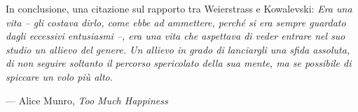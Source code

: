 \documentclass[serif,notheorems]{beamer}
\theoremstyle{definition} %
\theoremstyle{remark}
\begin{document}
\begin{frame}

\begin{center}
In conclusione, una citazione sul rapporto tra Weierstrass e Kowalevski:
\textit{
Era una vita -- gli costava dirlo, come ebbe ad ammettere,
perché si era sempre guardato dagli eccessivi entusiasmi --, era una vita
che aspettava di veder entrare nel suo studio un allievo del genere. 
Un allievo in grado di lanciargli una sfida assoluta, 
di non seguire soltanto il percorso spericolato della sua mente, 
ma se possibile di spiccare un volo più alto.
}
\end{center}
\null\hfill --- Alice Munro, \textit{Too Much Happiness}
\end{frame}
\end{document}

